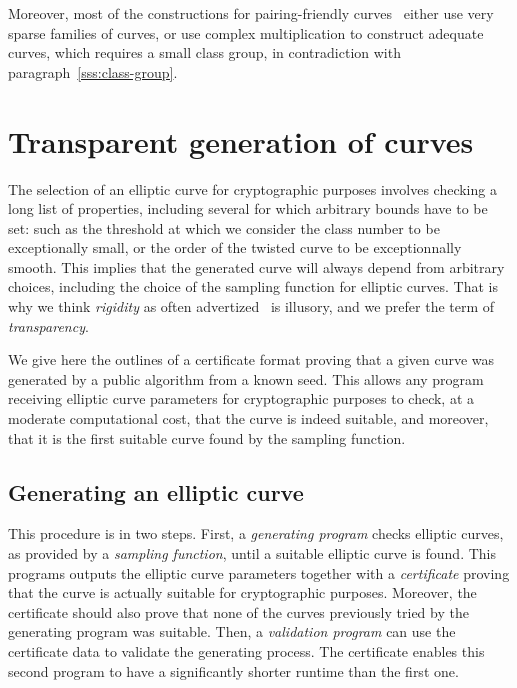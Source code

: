\documentclass[twocolumn,letterpaper,10pt]{article}
\begin{document}
Moreover, most of the constructions
for pairing-friendly curves~\cite{jc2010fst,space2014em}
either use very sparse families of curves,
or use complex multiplication to construct adequate curves,
which requires a small class group,
in contradiction with paragraph~\ref{sss:class-group}.

\section{Transparent generation of curves}
\label{s:certif}

The selection of an elliptic curve for cryptographic purposes
involves checking a long list of properties,
including several for which arbitrary bounds have to be set:
such as the threshold at which we consider the class number
to be exceptionally small,
or the order of the twisted curve to be exceptionnally smooth.
This implies that the generated curve
will always depend from arbitrary choices,
including the choice of the sampling function for elliptic curves.
That is why we think \emph{rigidity} as often advertized~\cite{safecurves}
is illusory, and we prefer the term of \emph{transparency}.

We give here the outlines of a certificate format
proving that a given curve was generated by a public algorithm
from a known seed.
This allows any program receiving elliptic curve parameters
for cryptographic purposes
to check, at a moderate computational cost,
that the curve is indeed suitable,
and moreover, that it is the first suitable curve
found by the sampling function.

\subsection{Generating an elliptic curve}

This procedure is in two steps.
First, a \emph{generating program}
checks elliptic curves, as provided by a \emph{sampling function},
until a suitable elliptic curve is found.
This programs outputs the elliptic curve parameters
together with a \emph{certificate} proving that
the curve is actually suitable for cryptographic purposes.
Moreover, the certificate should also prove that
none of the curves previously tried by the generating program
was suitable.
Then, a \emph{validation program} can use the certificate data
to validate the generating process.
The certificate enables this second program
to have a significantly shorter runtime than the first one.
\end{document}
